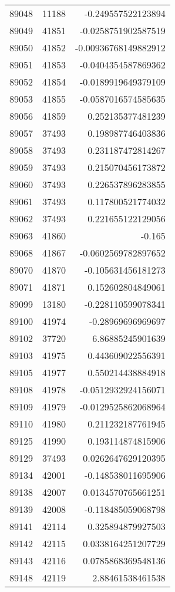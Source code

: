 \begin{tabular}{r | r | r}
89048 & 11188 & -0.249557522123894 \\
89049 & 41851 & -0.0258751902587519 \\
89050 & 41852 & -0.00936768149882912 \\
89051 & 41853 & -0.0404354587869362 \\
89052 & 41854 & -0.0189919649379109 \\
89053 & 41855 & -0.0587016574585635 \\
89056 & 41859 & 0.252135377481239 \\
89057 & 37493 & 0.198987746403836 \\
89058 & 37493 & 0.231187472814267 \\
89059 & 37493 & 0.215070456173872 \\
89060 & 37493 & 0.226537896283855 \\
89061 & 37493 & 0.117800521774032 \\
89062 & 37493 & 0.221655122129056 \\
89063 & 41860 & -0.165 \\
89068 & 41867 & -0.0602569782897652 \\
89070 & 41870 & -0.105631456181273 \\
89071 & 41871 & 0.152602804849061 \\
89099 & 13180 & -0.228110599078341 \\
89100 & 41974 & -0.28969696969697 \\
89102 & 37720 & 6.86885245901639 \\
89103 & 41975 & 0.443609022556391 \\
89105 & 41977 & 0.550214438884918 \\
89108 & 41978 & -0.0512932924156071 \\
89109 & 41979 & -0.0129525862068964 \\
89110 & 41980 & 0.211232187761945 \\
89125 & 41990 & 0.193114874815906 \\
89129 & 37493 & 0.0262647629120395 \\
89134 & 42001 & -0.148538011695906 \\
89138 & 42007 & 0.0134570765661251 \\
89139 & 42008 & -0.118485059068798 \\
89141 & 42114 & 0.325894879927503 \\
89142 & 42115 & 0.0338164251207729 \\
89143 & 42116 & 0.0785868369548136 \\
89148 & 42119 & 2.88461538461538 \\

\end{tabular}
